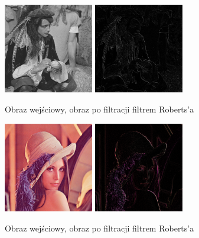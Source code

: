 \documentclass[final,a4paper,openany,12pt]{mwbk}
\begin{document}
\begin{figure}[H]
	\begin{center}
		\includegraphics[width=0.35\textwidth]{pirate_gray}
		\includegraphics[width=0.35\textwidth]{pirate_gray_highpassRoberts_result}
	\end{center}
	\caption{Obraz wejściowy, obraz po filtracji filtrem Roberts'a}
\end{figure}

\begin{figure}[H]
	\begin{center}
		\includegraphics[width=0.35\textwidth]{lena_color}
		\includegraphics[width=0.35\textwidth]{lena_color_highpassRoberts_result}
	\end{center}
	\caption{Obraz wejściowy, obraz po filtracji filtrem Roberts'a}
\end{figure}
\end{document}
